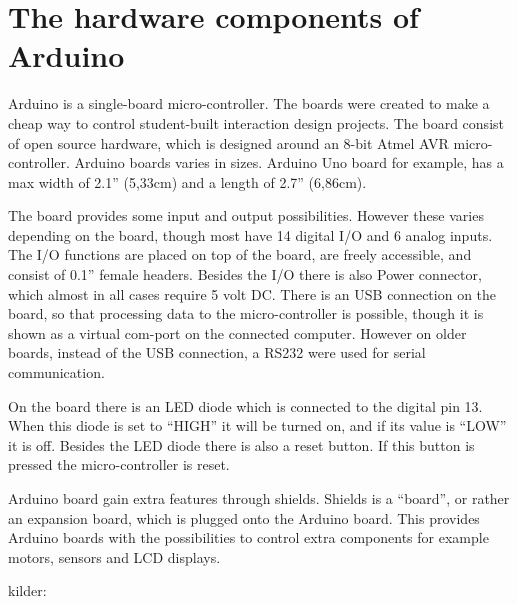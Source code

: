 \section{The hardware components of Arduino}
Arduino is a single-board micro-controller.
The boards were created to make a cheap way to control student-built interaction design projects. The board consist of open source hardware, which is designed around an 8-bit Atmel AVR micro-controller. Arduino boards varies in sizes. Arduino Uno board for example, has a max width of 2.1'' (5,33cm) and a length of 2.7'' (6,86cm). 

The board provides some input and output possibilities. However these varies depending on the board, though most have 14 digital I/O and 6 analog inputs. The I/O functions are placed on top of the board, are freely accessible, and consist of 0.1'' female headers. Besides the I/O there is also Power connector, which almost in all cases require 5 volt DC. There is an USB connection on the board, so that processing data to the micro-controller is possible, though it is shown as a virtual com-port on the connected computer. However on older boards, instead of the USB connection, a RS232 were used for serial communication. 

On the board there is an LED diode which is connected to the digital pin 13. When this diode is set to ``HIGH'' it will be turned on, and if its value is ``LOW'' it is off. Besides the LED diode there is also a reset button. If this button is pressed the micro-controller is reset. 

Arduino board gain extra features through shields. Shields is a ``board'', or rather an expansion board, which is plugged onto the Arduino board. This provides Arduino boards with the possibilities to control extra components for example motors, sensors and LCD displays.

kilder:
%
